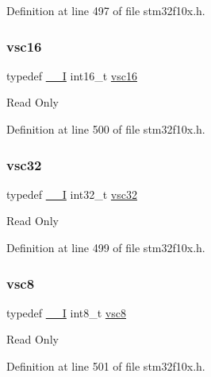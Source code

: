 Definition at line 497 of file stm32f10x.\+h.

\mbox{\label{group___exported__types_ga369ae0177b957e5afa7c1e62312f97c3}} 
\subsubsection{\texorpdfstring{vsc16}{vsc16}}
{\footnotesize\ttfamily typedef \hyperlink{core__sc300_8h_af63697ed9952cc71e1225efe205f6cd3}{\+\_\+\+\_\+I} int16\+\_\+t \hyperlink{group___exported__types_ga369ae0177b957e5afa7c1e62312f97c3}{vsc16}}

Read Only 

Definition at line 500 of file stm32f10x.\+h.

\mbox{\label{group___exported__types_gaec1d22666cf030b79051e5daa372fbc8}} 
\subsubsection{\texorpdfstring{vsc32}{vsc32}}
{\footnotesize\ttfamily typedef \hyperlink{core__sc300_8h_af63697ed9952cc71e1225efe205f6cd3}{\+\_\+\+\_\+I} int32\+\_\+t \hyperlink{group___exported__types_gaec1d22666cf030b79051e5daa372fbc8}{vsc32}}

Read Only 

Definition at line 499 of file stm32f10x.\+h.

\mbox{\label{group___exported__types_ga47463bcded079ac61d5da46aff497803}} 
\subsubsection{\texorpdfstring{vsc8}{vsc8}}
{\footnotesize\ttfamily typedef \hyperlink{core__sc300_8h_af63697ed9952cc71e1225efe205f6cd3}{\+\_\+\+\_\+I} int8\+\_\+t \hyperlink{group___exported__types_ga47463bcded079ac61d5da46aff497803}{vsc8}}

Read Only 

Definition at line 501 of file stm32f10x.\+h.

